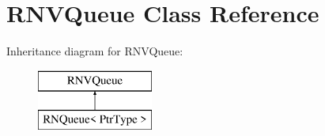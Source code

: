 \hypertarget{class_r_n_v_queue}{}\section{R\+N\+V\+Queue Class Reference}
\label{class_r_n_v_queue}
Inheritance diagram for R\+N\+V\+Queue\+:\begin{figure}[H]
\begin{center}
\leavevmode
\includegraphics[height=2.000000cm]{class_r_n_v_queue}
\end{center}
\end{figure}
